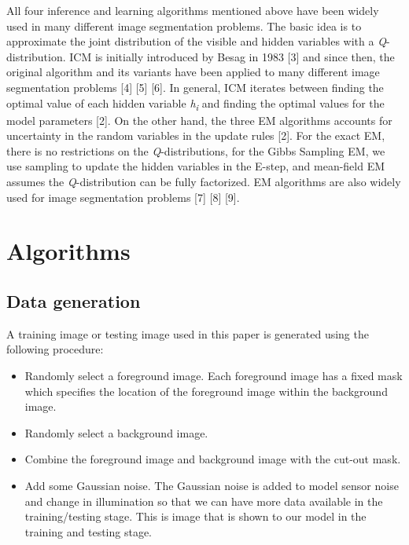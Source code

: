 \documentclass{article} %
\begin{document}
All four inference and learning algorithms mentioned above have been widely used in many different image segmentation problems. The basic idea is to approximate the joint distribution of the visible and hidden variables with a \textit{Q}-distribution. ICM is initially introduced by Besag in 1983 [3] and since then, the original algorithm and its variants have been applied to many different image segmentation problems [4] [5] [6]. In general, ICM iterates between finding the optimal value of each hidden variable \textit{h}\textsubscript{\textit{i}} and finding the optimal values for the model parameters [2]. On the other hand, the three EM algorithms accounts for uncertainty in the random variables in the update rules [2]. For the exact EM, there is no restrictions on the \textit{Q}-distributions, for the Gibbs Sampling EM, we use sampling to update the hidden variables in the E-step, and mean-field EM assumes the \textit{Q}-distribution can be fully factorized. EM algorithms are also widely used for image segmentation problems [7] [8] [9].

\section{Algorithms}
\label{alog}
\subsection{Data generation}
\label{data_gen}
A training image or testing image used in this paper is generated using the following procedure:
\begin{itemize}

\item Randomly select a foreground image. Each foreground image has a fixed mask which specifies the location of the foreground image within the background image.

\item Randomly select a background image.

\item Combine the foreground image and background image with the cut-out mask.

\item Add some Gaussian noise. The Gaussian noise is added to model sensor noise and change in illumination so that we can have more data available in the training/testing stage. This is image that is shown to our model in the training and testing stage.
\end{itemize}
\end{document}
